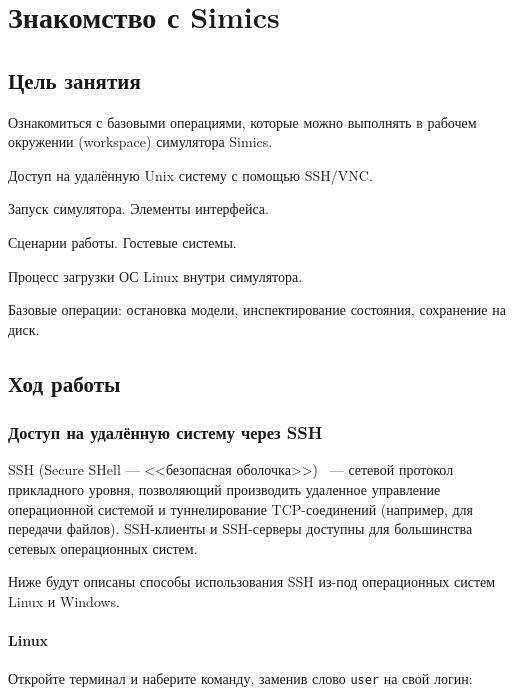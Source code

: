 \chapter{Знакомство с Simics}\label{chap:lab01}

\section{Цель занятия}

Ознакомиться с базовыми операциями, которые можно выполнять в рабочем окружении (\abbr workspace) симулятора Simics.

\begin{itemize*}
    \item Доступ на удалённую Unix систему с помощью SSH/VNC.
    \item Запуск симулятора. Элементы интерфейса.
    \item Сценарии работы. Гостевые системы. 
    \item Процесс загрузки ОС Linux внутри симулятора.
    \item Базовые операции: остановка модели, инспектирование состояния, сохранение на диск.
\end{itemize*}

\section{Ход работы}

\subsection{Доступ на удалённую систему через SSH}\label{subsec:ssh}

SSH (\abbr Secure SHell --- <<безопасная оболочка>>)~\cite{openssh} --- сетевой протокол прикладного уровня, позволяющий производить удаленное управление операционной системой и туннелирование TCP-соединений (например, для передачи файлов). SSH-клиенты и SSH-серверы доступны для большинства сетевых операционных систем.

Ниже будут описаны способы использования SSH из-под операционных систем Linux и Windows.

\subsubsection{Linux}

Откройте терминал и наберите команду, заменив слово \texttt{user} на свой логин:


